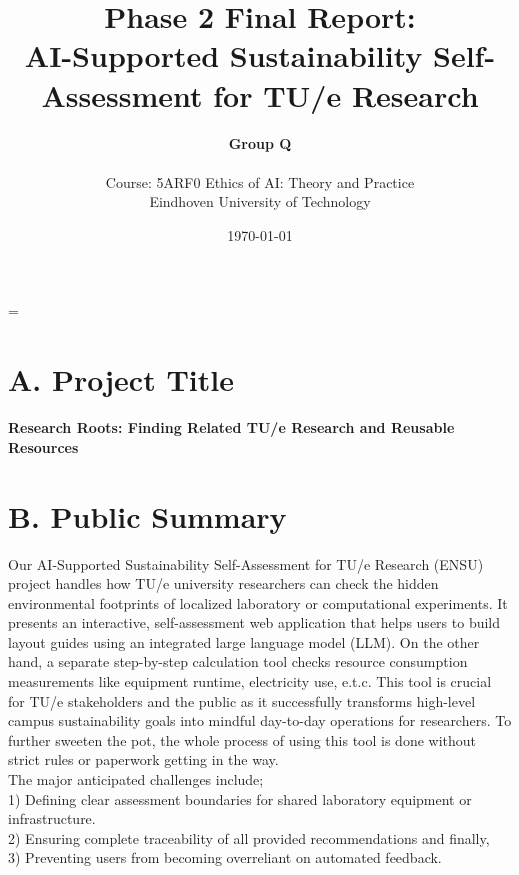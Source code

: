 \documentclass[11pt,a4paper]{article}
\title{\textbf{Phase 2 Final Report:\\ AI-Supported Sustainability Self-Assessment for TU/e Research}}
\author{\textbf{Group Q} \\\\
Course: 5ARF0 Ethics of AI: Theory and Practice \\
Eindhoven University of Technology}
\date{\today}
\begin{document}
\maketitle
\vspace{1cm}

\thispagestyle{empty}
\clearpage
\pagestyle{plain}
=
\section*{A. Project Title}

\noindent\textbf{Research Roots: Finding Related TU/e Research and Reusable Resources}
\section*{B. Public Summary}


\vspace{1em}
\noindent Our AI-Supported Sustainability Self-Assessment for TU/e Research (ENSU) project handles how TU/e university researchers can check the hidden environmental footprints of localized laboratory or computational experiments. It presents an interactive, self-assessment web application that helps users to build layout guides using an integrated large language model (LLM). On the other hand, a separate step-by-step calculation tool checks resource consumption measurements like equipment runtime, electricity use, e.t.c. This tool is crucial for TU/e stakeholders and the public as it successfully transforms high-level campus sustainability goals into mindful day-to-day operations for researchers. To further sweeten the pot, the whole process of using this tool is done without strict rules or paperwork getting in the way.\\ 

The major anticipated challenges include;\\ 1) Defining clear assessment boundaries for shared laboratory equipment or infrastructure.\\ 2) Ensuring complete traceability of all provided recommendations and finally,\\ 3) Preventing users from becoming overreliant on automated feedback.
\clearpage
\end{document}
